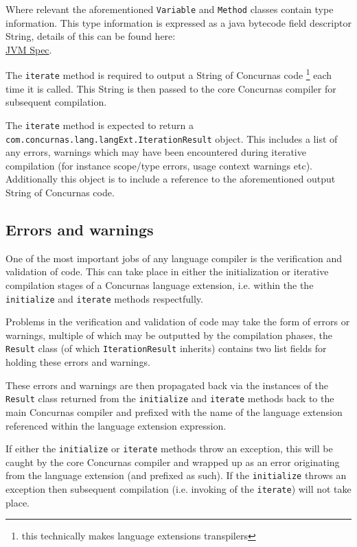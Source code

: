 \documentclass[conc-doc]{subfiles}
\begin{document}
Where relevant the aforementioned \lstinline{Variable} and \lstinline{Method} classes contain type information. This type information is expressed as a java bytecode field descriptor String, details of this can be found here:\\ \href{https://docs.oracle.com/javase/specs/jvms/se7/html/jvms-4.html#jvms-4.3.2}{JVM Spec}.

The \lstinline{iterate} method is required to output a String of Concurnas code \footnote{this technically makes language extensions transpilers} each time it is called. This String is then passed to the core Concurnas compiler for subsequent compilation.

The \lstinline{iterate} method is expected to return a \lstinline{com.concurnas.lang.langExt.IterationResult} object. This includes a list of any errors, warnings which may have been encountered during iterative compilation (for instance scope/type errors, usage context warnings etc). Additionally this object is to include a reference to the aforementioned output String of Concurnas code.


\subsection{Errors and warnings}
One of the most important jobs of any language compiler is the verification and validation of code. This can take place in either the initialization or iterative compilation stages of a Concurnas language extension, i.e. within the the \lstinline{initialize} and \lstinline{iterate} methods respectfully.

Problems in the verification and validation of code may take the form of errors or warnings, multiple of which may be outputted by the compilation phases, the \lstinline{Result} class (of which \lstinline{IterationResult} inherits) contains two list fields for holding these errors and warnings.

These errors and warnings are then propagated back via the instances of the \lstinline{Result} class returned from the \lstinline{initialize} and \lstinline{iterate} methods back to the main Concurnas compiler and prefixed with the name of the language extension referenced within the language extension expression.

If either the \lstinline{initialize} or \lstinline{iterate} methods throw an exception, this will be caught by the core Concurnas compiler and wrapped up as an error originating from the language extension (and prefixed as such). If the \lstinline{initialize} throws an exception then subsequent compilation (i.e. invoking of the \lstinline{iterate}) will not take place.
\end{document}
